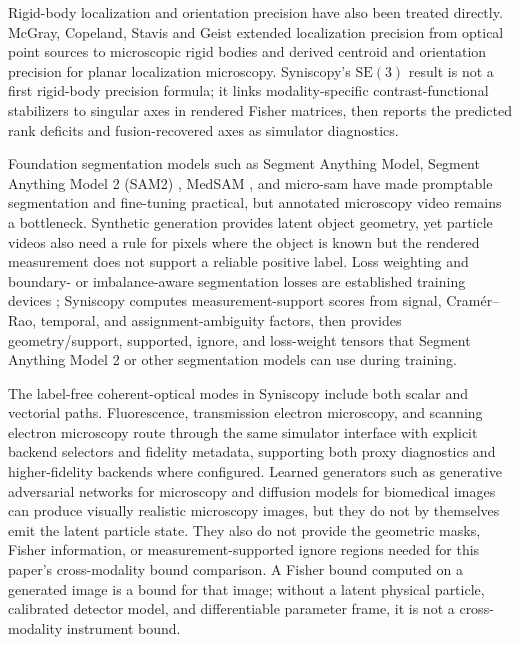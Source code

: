 Rigid-body localization and orientation precision have also been treated directly. McGray, Copeland, Stavis and Geist \cite{orientation-precision} extended localization precision from optical point sources to microscopic rigid bodies and derived centroid and orientation precision for planar localization microscopy. Syniscopy's $\mathrm{SE}(3)$ result is not a first rigid-body precision formula; it links modality-specific contrast-functional stabilizers to singular axes in rendered Fisher matrices, then reports the predicted rank deficits and fusion-recovered axes as simulator diagnostics.

Foundation segmentation models such as Segment Anything Model, Segment Anything Model 2 (SAM2) \cite{sam,sam2}, MedSAM \cite{medsam}, and micro-sam \cite{microsam} have made promptable segmentation and fine-tuning practical, but annotated microscopy video remains a bottleneck. Synthetic generation provides latent object geometry, yet particle videos also need a rule for pixels where the object is known but the rendered measurement does not support a reliable positive label. Loss weighting and boundary- or imbalance-aware segmentation losses are established training devices \cite{dice-loss,boundary-loss}; Syniscopy computes measurement-support scores from signal, Cram\'{e}r--Rao, temporal, and assignment-ambiguity factors, then provides geometry/support, supported, ignore, and loss-weight tensors that Segment Anything Model 2 or other segmentation models can use during training.

The label-free coherent-optical modes in Syniscopy include both scalar and vectorial paths. Fluorescence, transmission electron microscopy, and scanning electron microscopy route through the same simulator interface with explicit backend selectors and fidelity metadata, supporting both proxy diagnostics and higher-fidelity backends where configured. Learned generators such as generative adversarial networks for microscopy and diffusion models for biomedical images \cite{gan-microscopy,diffusion-microscopy} can produce visually realistic microscopy images, but they do not by themselves emit the latent particle state. They also do not provide the geometric masks, Fisher information, or measurement-supported ignore regions needed for this paper's cross-modality bound comparison. A Fisher bound computed on a generated image is a bound for that image; without a latent physical particle, calibrated detector model, and differentiable parameter frame, it is not a cross-modality instrument bound.
